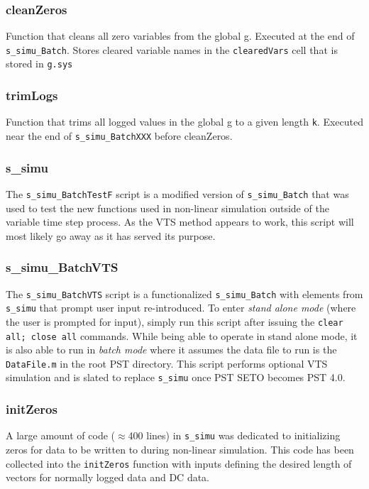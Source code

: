 \subsubsection{cleanZeros}  
Function that cleans all zero variables from the global g.
Executed at the end of \verb|s_simu_Batch|.
Stores cleared variable names in the \verb|clearedVars| cell that is stored in \verb|g.sys|

\subsubsection{trimLogs}  
Function that trims all logged values in the global g to a given length \verb|k|.
Executed near the end of \verb|s_simu_BatchXXX| before cleanZeros.

\subsubsection{s\_simu}  
The \verb|s_simu_BatchTestF| script is a modified version of \verb|s_simu_Batch| that was used to test the new functions used in non-linear simulation outside of the variable time step process.
As the VTS method appears to work, this script will most likely go away as it has served its purpose.

\subsubsection{s\_simu\_BatchVTS}  
The \verb|s_simu_BatchVTS| script is a functionalized \verb|s_simu_Batch| with elements from \verb|s_simu| that prompt user input re-introduced.
To enter \emph{stand alone mode} (where the user is prompted for input), simply run this script after issuing the \verb|clear all; close all| commands.
While being able to operate in stand alone mode, it is also able to run in \emph{batch mode} where it assumes the data file to run is the \verb|DataFile.m| in the root PST directory.
This script performs optional VTS simulation and is slated to replace \verb|s_simu| once PST SETO becomes PST 4.0.


\subsubsection{initZeros}  
A large amount of code ($\approx$400 lines) in \verb|s_simu| was dedicated to initializing zeros for data to be written to during non-linear simulation.
This code has been collected into the \verb|initZeros| function with inputs defining the desired length of vectors for normally logged data and DC data.

